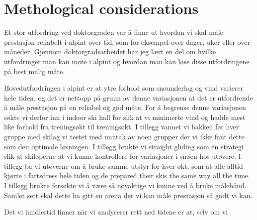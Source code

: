 \section{Methological considerations}
Et stor utfordring ved doktorgraden var å finne ut hvordan vi skal måle prestasjon reliabelt i alpint over tid, som for eksempel over dager, uker eller over måneder. Gjennom doktorgradsarbeidet har jeg lært en del om hvilke utfordringer man kan møte i alpint og hvordan man kan løse disse utfordringene på best mulig måte. 

Hovedutfordringen i alpint er at ytre forhold som snøunderlag og vind varierer hele tiden, og det er nettopp på grunn av denne variasjonen at det er utfordrende å måle prestasjon på en reliabel og god måte. For å begrense denne variasjonen søkte vi derfor inn i indoor ski hall for slik at vi minimerte vind og hadde mest like forhold fra treningsøkt til treningsøkt.  I tillegg vannet vi bakken før hver gruppe med skilag vi testet med unntak av noen grupper der vi ikke fant dette som den optimale løsningen. I tillegg brukte vi straight gliding som en strategi slik at skiløperne at vi kunne kontrollere for variasjoner i snøen hos utøvere. I tillegg ba vi utøverne om å bruke samme utstyr for hver økt, som at alle alltid kjørte i fartsdress hele tiden og de prepared their skis the same way all the time. I tillegg brukte forsøkte vi å være så nøyaktige vi kunne ved å bruke målebånd. Samlet sett skal dette ha gitt en arena der vi kan måle prestasjon så godt vi kan. 

Det vi imidlertid finner når vi analyserer rett ned tidene er at, selv om vi 
